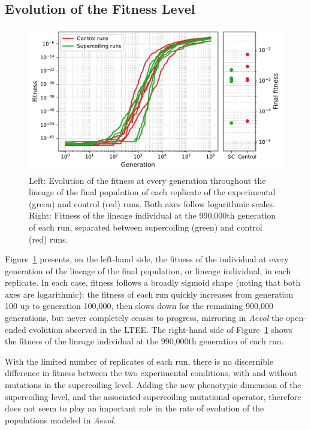 \subsection{Evolution of the Fitness Level}

\begin{figure}
\includegraphics[width=\textwidth]{aevol/images/fitness_all.pdf}
\caption[Evolution of the fitness of the control and experimental runs in \emph{Aevol}]{Left: Evolution of the fitness at every generation throughout the lineage of the final population of each replicate of the experimental (green) and control (red) runs.
Both axes follow logarithmic scales.
Right: Fitness of the lineage individual at the 990,000th generation of each run, separated between supercoiling (green) and control (red) runs.}
\label{fig:aevol:fitness}
\end{figure}

Figure~\ref{fig:aevol:fitness} presents, on the left-hand side, the fitness of the individual at every generation of the lineage of the final population, or lineage individual, in each replicate.
In each case, fitness follows a broadly sigmoid shape (noting that both axes are logarithmic): the fitness of each run quickly increases from generation 100 up to generation 100,000, then slows down for the remaining 900,000 generations, but never completely ceases to progress, mirroring in \emph{Aevol} the open-ended evolution observed in the LTEE.
The right-hand side of Figure~\ref{fig:aevol:fitness} shows the fitness of the lineage individual at the 990,000th generation of each run.

With the limited number of replicates of each run, there is no discernible difference in fitness between the two experimental conditions, with and without mutations in the supercoiling level.
Adding the new phenotypic dimension of the supercoiling level, and the associated supercoiling mutational operator, therefore does not seem to play an important role in the rate of evolution of the populations modeled in \emph{Aevol}.

